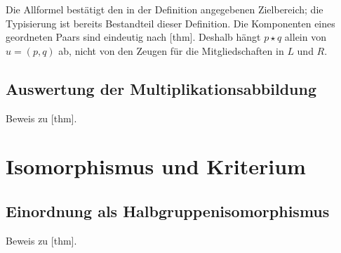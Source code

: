 Die Allformel bestätigt den in der Definition angegebenen Zielbereich;
die Typisierung ist bereits Bestandteil dieser Definition.
Die Komponenten eines geordneten Paars sind eindeutig nach
[thm].
Deshalb hängt \(p\star q\) allein von \(u=(p,q)\) ab, nicht von den
Zeugen für die Mitgliedschaften in \(L\) und \(R\).
\subsection{Auswertung der Multiplikationsabbildung}
\hypertarget{coordinates.proof.SemigroupCoordinateMultiplicationMapEvaluation}{}
\noindent Beweis zu
[thm].
\begin{tabproofwide}
\end{tabproofwide}

\section{Isomorphismus und Kriterium}

\subsection{Einordnung als Halbgruppenisomorphismus}
\hypertarget{coordinates.proof.SemigroupCoordinateIsoIsSemigroupIso}{}
\noindent Beweis zu
[thm].
\begin{tabproofwide}
\end{tabproofwide}

